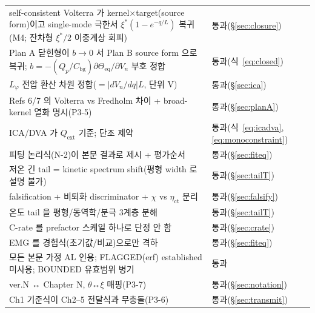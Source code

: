 \documentclass[11pt,a4paper]{article}
\newcommand{\eq}{\mathrm{eq}}
\newcommand{\bg}{\mathrm{bg}}
\newcommand{\ext}{\mathrm{ext}}
\begin{document}
\begin{longtable}{p{} p{}}
self-consistent Volterra 가 kernel$\times$target(source form)이고 single-mode 극한서 $\xi^\ast(1-e^{-q/L})$ 복귀(M4; 잔차형 $\xi^\ast/2$ 이중계상 회피) & 통과(\S\ref{sec:closure}) \\
Plan A 닫힌형이 $b\to0$ 서 Plan B source form 으로 복귀; $b=-(Q_p/C_\bg)\partial\Theta_\eq/\partial V_n$ 부호 정합 & 통과(식~\eqref{eq:closed}) \\
$L_\varphi$ 전압 환산 차원 정합($=|dV_n/dq|L$, 단위 V) & 통과(\S\ref{sec:ica}) \\
Refs 6/7 의 Volterra vs Fredholm 차이 + broad-kernel 열화 명시(P3-5) & 통과(\S\ref{sec:planA}) \\
ICA/DVA 가 $Q_\ext$ 기준; 단조 제약 & 통과(식~\eqref{eq:icadva},\eqref{eq:monoconstraint}) \\
피팅 논리식(N-2)이 본문 결과로 제시 + 평가순서 & 통과(\S\ref{sec:fiteq}) \\
저온 긴 tail = kinetic spectrum shift(평형 width 로 설명 불가) & 통과(\S\ref{sec:tailT}) \\
falsification + 비퇴화 discriminator + $\chi$ vs $\eta_\mathrm{ct}$ 분리 & 통과(\S\ref{sec:falsify}) \\
온도 tail 을 평형/동역학/분극 3계층 분해 & 통과(\S\ref{sec:tailT}) \\
C-rate 를 prefactor 스케일 하나로 단정 안 함 & 통과(\S\ref{sec:crate}) \\
EMG 를 경험식(초기값/비교)으로만 격하 & 통과(\S\ref{sec:fiteq}) \\
모든 본문 가정 AL 인용; FLAGGED(erf) established 미사용; BOUNDED 유효범위 병기 & 통과 \\
ver.N ↔ Chapter N, $\theta$↔$\xi$ 매핑(P3-7) & 통과(\S\ref{sec:notation}) \\
Ch1 기준식이 Ch2--5 전달식과 무충돌(P3-6) & 통과(\S\ref{sec:transmit}) \\
\bottomrule
\end{longtable}
\end{document}
